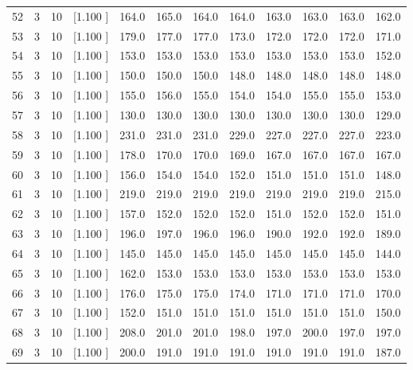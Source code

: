 \documentclass[12pt,a4paper]{article}
\begin{document}
\begin{center}
{\begin{tabular}{r r r r r r r r r r r r}
  52&  3& 10&[1.100     ]&   164.0&   165.0&   164.0&   164.0&   163.0&   163.0&   163.0&   162.0\\[-0.02in]
  53&  3& 10&[1.100     ]&   179.0&   177.0&   177.0&   173.0&   172.0&   172.0&   172.0&   171.0\\[-0.02in]
  54&  3& 10&[1.100     ]&   153.0&   153.0&   153.0&   153.0&   153.0&   153.0&   153.0&   152.0\\[-0.02in]
  55&  3& 10&[1.100     ]&   150.0&   150.0&   150.0&   148.0&   148.0&   148.0&   148.0&   148.0\\[-0.02in]
  56&  3& 10&[1.100     ]&   155.0&   156.0&   155.0&   154.0&   154.0&   155.0&   155.0&   153.0\\[-0.02in]
  57&  3& 10&[1.100     ]&   130.0&   130.0&   130.0&   130.0&   130.0&   130.0&   130.0&   129.0\\[-0.02in]
  58&  3& 10&[1.100     ]&   231.0&   231.0&   231.0&   229.0&   227.0&   227.0&   227.0&   223.0\\[-0.02in]
  59&  3& 10&[1.100     ]&   178.0&   170.0&   170.0&   169.0&   167.0&   167.0&   167.0&   167.0\\[-0.02in]
  60&  3& 10&[1.100     ]&   156.0&   154.0&   154.0&   152.0&   151.0&   151.0&   151.0&   148.0\\[-0.02in]
  61&  3& 10&[1.100     ]&   219.0&   219.0&   219.0&   219.0&   219.0&   219.0&   219.0&   215.0\\[-0.02in]
  62&  3& 10&[1.100     ]&   157.0&   152.0&   152.0&   152.0&   151.0&   152.0&   152.0&   151.0\\[-0.02in]
  63&  3& 10&[1.100     ]&   196.0&   197.0&   196.0&   196.0&   190.0&   192.0&   192.0&   189.0\\[-0.02in]
  64&  3& 10&[1.100     ]&   145.0&   145.0&   145.0&   145.0&   145.0&   145.0&   145.0&   144.0\\[-0.02in]
  65&  3& 10&[1.100     ]&   162.0&   153.0&   153.0&   153.0&   153.0&   153.0&   153.0&   153.0\\[-0.02in]
  66&  3& 10&[1.100     ]&   176.0&   175.0&   175.0&   174.0&   171.0&   171.0&   171.0&   170.0\\[-0.02in]
  67&  3& 10&[1.100     ]&   152.0&   151.0&   151.0&   151.0&   151.0&   151.0&   151.0&   150.0\\[-0.02in]
  68&  3& 10&[1.100     ]&   208.0&   201.0&   201.0&   198.0&   197.0&   200.0&   197.0&   197.0\\[-0.02in]
  69&  3& 10&[1.100     ]&   200.0&   191.0&   191.0&   191.0&   191.0&   191.0&   191.0&   187.0\\[-0.02in]

\end{tabular}}
\end{center}
\end{document}

